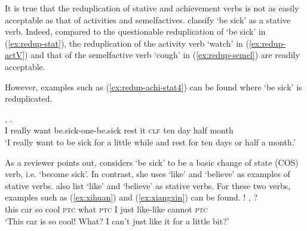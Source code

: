 It is true that  the reduplication of stative and achievement verbs is not as easily acceptable as that of activities and semelfactives.
\citet[155]{XiaoMcEnery2004} classify  `be sick' as a stative verb.
Indeed, compared  to the questionable reduplication of  `be sick' in (\ref{ex:redup-stat}),  
 the reduplication of the activity verb  `watch' in (\ref{ex:redup-actV})
and that of the semelfactive verb  `cough' in (\ref{ex:redup-semel}) are readily acceptable.

\settowidth{}

\ea
{}\label{ex:redup-stat}

\label{ex:redup-actV}

\label{ex:redup-semel}
\z
\z

However, examples such as (\ref{ex:redup-achi-stat4}) can be found where  `be sick' is reduplicated.

\ea\label{ex:redup-achi-stat4}
\gll {}   ,       .\\
I really want be.sick-one-be.sick rest it \textsc{clf} ten day half month\\ 
\glt `I really want to be sick for a little while and rest for ten days or half a month.'
\z

As a reviewer points out, \citet[Sec. 3.3]{Tham2013} considers   `be sick' to be a basic change of state (COS) verb, i.e. `become sick'.
In contrast, she uses  `like' and  `believe' as examples of stative verbs.
\citet[680]{PeckEtAl2013} also list  `like' and  `believe' as stative verbs.
For these two verbs, examples such as (\ref{ex:xihuan}) and (\ref{ex:xiangxin}) can be found.
\ea\label{ex:xihuan}%
\gll {}    !  ,     ?\\
this car so cool \textsc{ptc} what \textsc{ptc} I just like-like cannot \textsc{ptc}\\
\glt `This car is so cool! What? I can't just like it for a little bit?'

